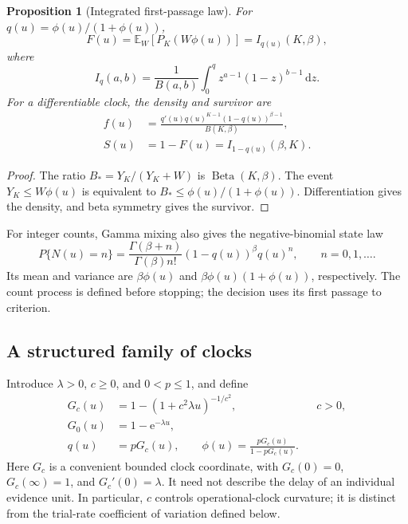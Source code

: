 \documentclass[12pt]{article}
\newcommand{\dd}{\,\mathrm{d}}
\newcommand{\e}{\mathrm{e}}
\newcommand{\BetaDist}{\operatorname{Beta}}
\newcommand{\E}{\mathbb{E}}
\theoremstyle{definition}
\theoremstyle{plain}
\newtheorem{proposition}{Proposition}
\theoremstyle{remark}
\begin{document}
\begin{proposition}[Integrated first-passage law]\label{prop:beta}
For $q(u)=\phi(u)/(1+\phi(u))$,
\begin{equation}
 F(u)=\E_W[P_K(W\phi(u))]=I_{q(u)}(K,\beta),\label{eq:beta-cdf}
\end{equation}
where
\begin{equation}
 I_q(a,b)=\frac{1}{B(a,b)}\int_0^q z^{a-1}(1-z)^{b-1}\dd z.
\end{equation}
For a differentiable clock, the density and survivor are
\begin{align}
 f(u)&=\frac{q'(u)q(u)^{K-1}(1-q(u))^{\beta-1}}{B(K,\beta)},\label{eq:beta-density}\\
 S(u)&=1-F(u)=I_{1-q(u)}(\beta,K).\label{eq:beta-survivor}
\end{align}
\end{proposition}
\begin{proof}
The ratio $B_*=Y_K/(Y_K+W)$ is $\BetaDist(K,\beta)$. The event $Y_K\leq W\phi(u)$ is equivalent to $B_*\leq\phi(u)/(1+\phi(u))$. Differentiation gives the density, and beta symmetry gives the survivor.
\end{proof}
For integer counts, Gamma mixing also gives the negative-binomial state law
\begin{equation}
 P\{N(u)=n\}=\frac{\Gamma(\beta+n)}{\Gamma(\beta)n!}
 (1-q(u))^\beta q(u)^n,\qquad n=0,1,\ldots.\label{eq:nb-count}
\end{equation}
Its mean and variance are $\beta\phi(u)$ and $\beta\phi(u)(1+\phi(u))$, respectively. The count process is defined before stopping; the decision uses its first passage to criterion.

\subsection{A structured family of clocks}\label{sec:clocks}
Introduce $\lambda>0$, $c\geq0$, and $0<p\leq1$, and define
\begin{align}
 G_c(u)&=1-(1+c^2\lambda u)^{-1/c^2}, && c>0,\\
 G_0(u)&=1-\e^{-\lambda u},\\
 q(u)&=pG_c(u),\qquad
 \phi(u)=\frac{pG_c(u)}{1-pG_c(u)}.\label{eq:clock}
\end{align}
Here $G_c$ is a convenient bounded clock coordinate, with $G_c(0)=0$, $G_c(\infty)=1$, and $G_c'(0)=\lambda$. It need not describe the delay of an individual evidence unit. In particular, $c$ controls operational-clock curvature; it is distinct from the trial-rate coefficient of variation defined below.
\end{document}
